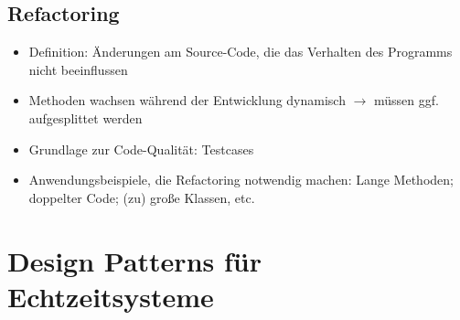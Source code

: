 \subsection{Refactoring}
\begin{itemize}
	\item Definition: Änderungen am Source-Code, die das Verhalten des Programms nicht beeinflussen
	\item Methoden wachsen während der Entwicklung dynamisch \(\rightarrow\) müssen ggf. aufgesplittet werden
	\item Grundlage zur Code-Qualität: Testcases
	\item Anwendungsbeispiele, die Refactoring notwendig machen: Lange Methoden; doppelter Code; (zu) große Klassen, etc.
\end{itemize}



\section{Design Patterns für Echtzeitsysteme}

